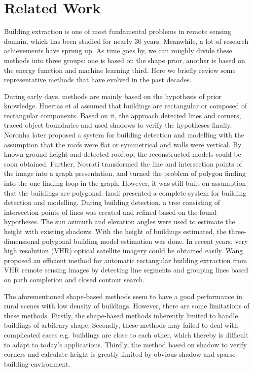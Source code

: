 \section{Related Work}
Building extraction is one of most fundamental problems in remote sensing domain, which has been studied for nearly 30 years. Meanwhile, a lot of research achievements have sprung up. As time goes by, we can roughly divide these methods into three groups: one is based on the shape prior, another is based on the energy function and machine learning third. Here we briefly review some representative methods that have evolved in the past decades.\par
\setlength{\parindent}{2ex}During early days, methods are mainly based on the hypothesis of prior knowledge. Huertas et al \cite{IEEEexample:huertas1988detecting} assumed that buildings are rectangular or composed of rectangular components. Based on it, the approach detected lines and corners, traced object boundaries and used shadows to verify the hypotheses finally. Noronha \cite{IEEEexample:noronha2001detection} later proposed a system for building detection and modelling with the assumption that the roofs were flat or symmetrical and walls were vertical. By known ground height and detected rooftop, the reconstructed models could be soon obtained. Further, Nosrati \cite{IEEEexample:nosrati2009novel} transformed the line and intersection points of the image into a graph presentation, and turned the problem of polygon finding into the one finding loop in the graph. However, it was still built on assumption that the buildings are polygonal. Izadi \cite{IEEEexample:izadi2012three} presented a complete system for building detection and modelling. During building detection, a tree consisting of intersection points of lines was created and refined based on the found hypotheses. The sun azimuth and elevation angles were used to estimate the height with existing shadows. With the height of buildings estimated, the three-dimensional polygonal building model estimation was done. In recent years, very high resolution (VHR) optical satellite imagery could be obtained easily. Wang \cite{IEEEexample:wang2015efficient} proposed an efficient method for automatic rectangular building extraction from VHR remote sensing images by detecting line segments and grouping lines based on path completion and closed contour search.\par
\setlength{\parindent}{2ex}The aforementioned shape-based methods seem to have a good performance in rural scenes with low density of buildings. However, there are some limitations of these methods. Firstly, the shape-based methods inherently limited to handle buildings of arbitrary shape. Secondly, these methods may failed to deal with complicated cases e.g. buildings are close to each other, which thereby is difficult to adapt to today's applications. Thirdly, the method based on shadow to verify corners and calculate height is greatly limited by obvious shadow and sparse building environment. \par
